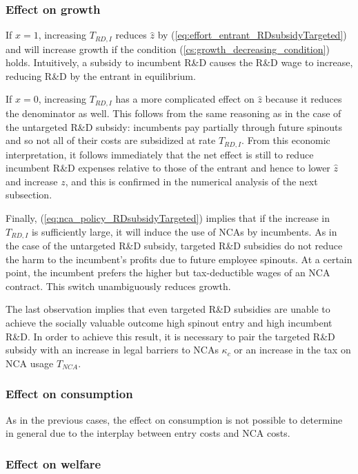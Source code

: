 \documentclass[11pt,english]{article}
\begin{document}
\subsubsection{Effect on growth}

If $x = 1$, increasing $T_{RD,I}$ reduces $\hat{z}$ by (\ref{eq:effort_entrant_RDsubsidyTargeted}) and will increase growth if the condition (\ref{cs:growth_decreasing_condition}) holds. Intuitively, a subsidy to incumbent R\&D causes the R\&D wage to increase, reducing R\&D by the entrant in equilibrium. 

If $x = 0$, increasing $T_{RD,I}$ has a more complicated effect on $\hat{z}$ because it reduces the denominator as well. This follows from the same reasoning as in the case of the untargeted R\&D subsidy: incumbents pay partially through future spinouts and so not all of their costs are subsidized at rate $T_{RD,I}$. From this economic interpretation, it follows immediately that the net effect is still to reduce incumbent R\&D expenses relative to those of the entrant and hence to lower $\hat{z}$ and increase $z$, and this is confirmed in the numerical analysis of the next subsection.

Finally, (\ref{eq:nca_policy_RDsubsidyTargeted}) implies that if the increase in $T_{RD,I}$ is sufficiently large, it will induce the use of NCAs by incumbents. As in the case of the untargeted R\&D subsidy, targeted R\&D subsidies do not reduce the harm to the incumbent's profits due to future employee spinouts. At a certain point, the incumbent prefers the higher but tax-deductible wages of an NCA contract. This switch unambiguously reduces growth.

The last observation implies that even targeted R\&D subsidies are unable to achieve the socially valuable outcome high spinout entry and high incumbent R\&D. In order to achieve this result, it is necessary to pair the targeted R\&D subsidy with an increase in legal barriers to NCAs $\kappa_c$ or an increase in the tax on NCA usage $T_{NCA}$. 

\subsubsection{Effect on consumption}

As in the previous cases, the effect on consumption is not possible to determine in general due to the interplay between entry costs and NCA costs. 

\subsubsection{Effect on welfare}
\end{document}
